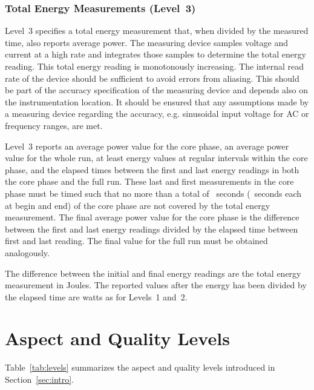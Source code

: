 \subsubsection{Total Energy Measurements (Level~3)}

Level~3 specifies a total energy measurement that, when divided by the measured time, also reports average power.
The measuring device samples voltage and current at a high rate and integrates those samples to determine the total energy reading.
This total energy reading is monotonously increasing.
The internal read rate of the device should be sufficient to avoid errors from aliasing.
This should be part of the accuracy specification of the measuring device and depends also on the instrumentation location.
It should be ensured that any assumptions made by a measuring device regarding the accuracy, e.g. sinusoidal input voltage for AC or frequency ranges, are met.

Level~3 reports an average power value for the core phase, an average power value for the whole run, at least \MinMeasurementsCorePhaseLTwoThree{} energy values at regular intervals within the core phase, and the elapsed times between the first and last energy readings in both the core phase and the full run.
These last and first measurements in the core phase must be timed such that no more than a total of \MaxSecMissingLThree{}~seconds (\MaxSecMissingLThreeHalf{}~seconds each at begin and end) of the core phase are not covered by the total energy measurement.
The final average power value for the core phase is the difference between the first and last energy readings divided by the elapsed time between first and last reading.
The final value for the full run must be obtained analogously.

The difference between the initial and final energy readings are the total energy measurement in Joules.
The reported values after the energy has been divided by the elapsed time are watts as for Levels~1 and~2.

\section{Aspect and Quality Levels}
\label{sec:AQLevels}

Table~\ref{tab:levels} summarizes the aspect and quality levels introduced in Section~\ref{sec:intro}. 

